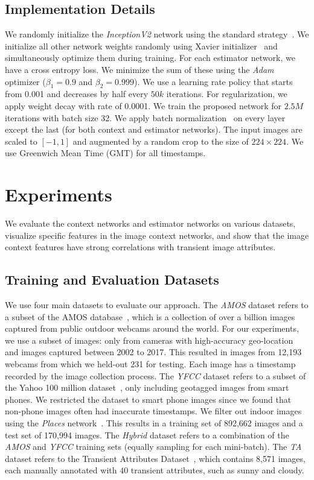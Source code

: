 \subsection{Implementation Details}

We randomly initialize the {\em InceptionV2} network using the
standard strategy~\cite{szegedy2016rethinking}.
We initialize all other network weights randomly using Xavier
initializer~\cite{glorot2010understanding} and
simultaneously optimize them during training. For each
estimator network, we have a cross entropy loss.  We minimize the sum
of these using the {\em Adam} optimizer \cite{kingma2014adam}
($\beta_1 = 0.9$ and $\beta_2 = 0.999$). We use a learning rate policy
that starts from 0.001 and decreases by half every $50k$ iterations.
For regularization, we apply weight decay with rate of 0.0001. We
train the proposed network for $2.5M$ iterations with batch size 32.
We apply batch
normalization~\cite{inception15} on every layer except the last (for
both context and estimator networks).  The input images are scaled to
$[-1,1]$ and augmented by a random crop to the size of $224 \times
224$. We use Greenwich Mean Time (GMT) for all timestamps.

\section{Experiments}

We evaluate the context networks and estimator networks on various
datasets, visualize specific features in the image context networks,
and show that the image context features have strong correlations with
transient image attributes.


\subsection{Training and Evaluation Datasets}

We use four main datasets to evaluate our approach.  The {\em AMOS}
dataset refers to a subset of the AMOS
database~\cite{jacobs07amos}, which is a collection of over a billion
images captured from public outdoor webcams around the world.  For our
experiments, we use a subset of images: only from cameras with
high-accuracy geo-location and images captured between 2002 to 2017.
This resulted in images from 12,193 webcams from which we held-out 231
for testing. Each image has a timestamp recorded by the image
collection process.  The {\em YFCC} dataset refers to a subset of
the Yahoo 100 million dataset~\cite{yfcc100m}, only including
geotagged images from smart phones.  We restricted the dataset to
smart phone images since we found that non-phone images often had
inaccurate timestamps.  We filter out indoor images using the {\em
Places} network~\cite{zhou2017places}. This results in a training set
of 892,662 images and a test set of 170,994 images.  The
{\em Hybrid} dataset refers to a combination of the {\em AMOS} and
{\em YFCC} training sets (equally sampling for each mini-batch).  The
{\em TA} dataset refers to the Transient Attributes
Dataset~\cite{laffont2014transient}, which contains 8,571 images, each
manually annotated with $40$ transient attributes, such as sunny and
cloudy.

